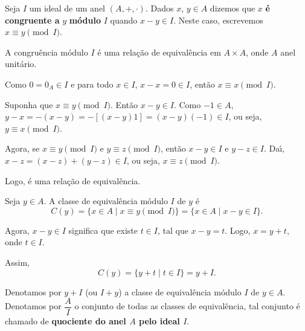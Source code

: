 \documentclass{beamer}
\begin{document}
    \begin{frame}
        \begin{definicao}
            Seja $I$ um ideal de um anel $(A, +, \cdot)$. Dados $x$, $y \in A$ dizemos que $x$ \textbf{\'e congruente a} $y$ \textbf{m\'odulo} $I$ quando $x-y \in I$. Neste caso, escrevemos $x\equiv y \pmod I$.
        \end{definicao}

        \begin{proposicao}
            A congru{\^e}ncia m{\'o}dulo $I$ {\'e} uma rela{\c c}{\~a}o de equival{\^e}ncia em $A \times A$, onde $A$ anel unit{\'a}rio.
        \end{proposicao}
        \begin{prova}
            Como $0 = 0_{A} \in I$ e para todo $x \in I$, $x - x = 0 \in I$, ent{\~a}o $x \equiv x \pmod I$.

            Suponha que $x\equiv y \pmod I$. Ent{\~a}o $x - y \in I$. Como $-1 \in A$, $y - x = -(x - y) = -[(x - y)1] = (x - y)(-1) \in I$, ou seja, $y\equiv x \pmod I$.

            Agora, se $x\equiv y \pmod I$ e $y\equiv z \pmod I$, ent{\~a}o $x - y \in I$ e $y - z \in I$. Da{\'\i}, $x - z = (x - z) + (y - z)\in I$, ou seja, $x\equiv z \pmod I$.

            Logo, {\'e} uma rela{\c c}{\~a}o de equival{\^e}ncia.
        \end{prova}
    \end{frame}

    \begin{frame}
        Seja $y \in A$. A classe de equival{\^e}ncia m{\'o}dulo $I$ de $y$ {\'e}
        \[
            C(y) = \{x \in A \mid x\equiv y \pmod I\} = \{x \in A \mid x - y \in I\}.
        \]

        Agora, $x - y \in I$ significa que existe $t \in I$, tal que $x - y = t$. Logo, $x = y + t$, onde $t \in I$.

        Assim,
        \[
            C(y) = \{y + t\mid t \in I\} = y + I.
        \]

        \begin{observacao}
            Denotamos por $y + I$ (ou $I + y$) a classe de equival{\^e}ncia m{\'o}dulo $I$ de $y \in A$. Denotamos por $\dfrac{A}{I}$ o conjunto de todas as classes de equival{\^e}ncia, tal conjunto {\'e} chamado de \textbf{quociente do anel $A$ pelo ideal $I$}.
        \end{observacao}
    \end{frame}
\end{document}
